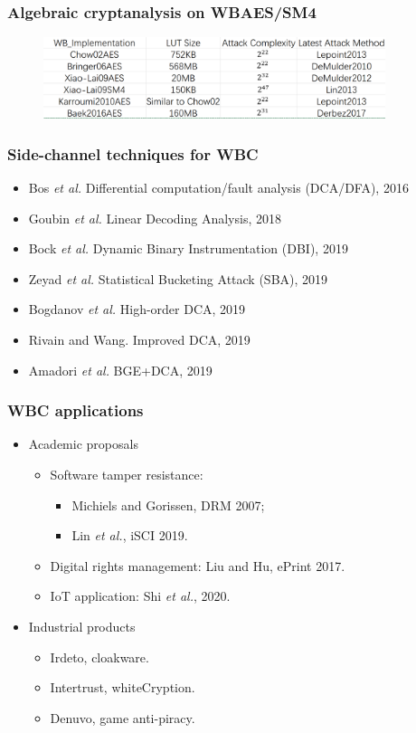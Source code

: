 \documentclass{beamer}
\begin{document}
\frame
{
\frametitle{Algebraic cryptanalysis on WBAES/SM4}
\begin{figure}[htbp]
\centering
  \includegraphics[width=10cm]{./pics/WBCCryptanlysis.png}
\end{figure}
}

\frame
{
\frametitle{Side-channel techniques for WBC}

\begin{itemize}
\item Bos \textit{et al.} Differential computation/fault analysis (DCA/DFA), 2016

\item Goubin \textit{et al.} Linear Decoding Analysis, 2018

\item Bock \textit{et al.} Dynamic Binary Instrumentation (DBI), 2019

\item Zeyad \textit{et al.} Statistical Bucketing Attack (SBA), 2019

\item Bogdanov \textit{et al.} High-order DCA, 2019

\item Rivain and Wang. Improved DCA, 2019

\item Amadori \textit{et al.} BGE+DCA, 2019

\end{itemize}

}

\frame
{
\frametitle{WBC applications}

\begin{itemize}
\item Academic proposals
\begin{itemize}
\item Software tamper resistance:
\begin{itemize}
\item Michiels and Gorissen, DRM 2007;
\item Lin \textit{et al.}, iSCI 2019.
\end{itemize}

\item Digital rights management: Liu and Hu, ePrint 2017.

\item IoT application: Shi \textit{et al.}, 2020.

\end{itemize}

\item Industrial products
\begin{itemize}
\item Irdeto, cloakware.
\item Intertrust, whiteCryption.
\item Denuvo, game anti-piracy.
\end{itemize}
\end{itemize}

}
\end{document}
